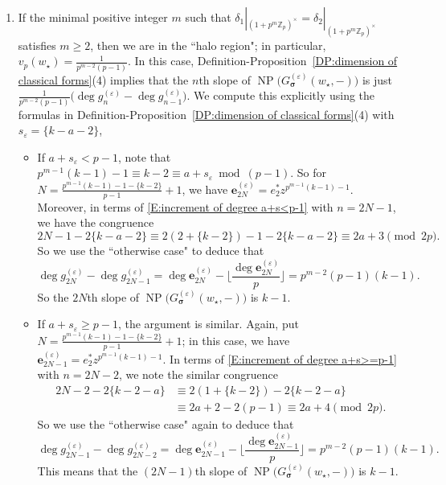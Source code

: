 \documentclass[12pt]{amsart}
\theoremstyle{definition}
\numberwithin{equation}{subsection}
\def\ZZ{\mathbb{Z}}
\def\bfe{\mathbf{e}}
\DeclareMathOperator{\NP}{NP}
\newcommand{\bbsigma}{\boldsymbol{\sigma}}
\begin{document}
\begin{enumerate}
\item[(2bii)] If the minimal positive integer $m$ such that $\delta_1|_{(1+p^m\ZZ_p)^\times}= \delta_2|_{(1+p^m\ZZ_p)^\times}$ satisfies $m\geq 2$, then we are in the ``halo region"; in particular, $v_p(w_\star) = \frac{1}{p^{m-2}(p-1)}$.
In this case, Definition-Proposition~\ref{DP:dimension of classical forms}(4) implies that the $n$th slope of $\NP\big( G_{\bbsigma}^{(\varepsilon)}(w_\star, -)\big)$ is just $\frac{1}{p^{m-2}(p-1)} \big( \deg g_n^{(\varepsilon)} - \deg g_{n-1}^{(\varepsilon)}\big)$.
We compute this explicitly using the formulas in Definition-Proposition~\ref{DP:dimension of classical forms}(4) with $s_\varepsilon = \{k-a-2\}$,
\begin{itemize}
\item If $a+s_\varepsilon<p-1$, note that $p^{m-1}(k-1)-1\equiv k-2 \equiv a+s_\varepsilon \bmod(p-1)$. So for $N = \frac{p^{m-1}(k-1)-1-\{k-2\}}{p-1}+1$, we have $\bfe_{2N}^{(\varepsilon)} = e_2^*z^{p^{m-1}(k-1)-1}$. Moreover, in terms of \eqref{E:increment of degree a+s<p-1} with $n = 2N-1$, we have the congruence
$$
2N-1 - 2\{k-a-2\} \equiv 2(2+\{k-2\}) - 1 - 2\{k-a-2\} \equiv 2a+3 \pmod{2p}.
$$
So we use the ``otherwise case" to deduce that
$$
\deg g_{2N}^{(\varepsilon)} - \deg g_{2N-1}^{(\varepsilon)} = \deg \bfe_{2N}^{(\varepsilon)} - \Big\lfloor \frac{\deg \bfe_{2N}^{(\varepsilon)}}p\Big\rfloor = p^{m-2}(p-1)(k-1).
$$
So the $2N$th slope of $\NP\big(G_{\bbsigma}^{(\varepsilon)}(w_\star,-)\big)$ is $k-1$.
\item If $a+s_\varepsilon\geq p-1$, the argument is similar.  Again, put $N =\frac{p^{m-1}(k-1)-1-\{k-2\}}{p-1}+1$; in this case, we have $\bfe_{2N-1}^{(\varepsilon)} = e_2^*z^{p^{m-1}(k-1)-1}$. In terms of \eqref{E:increment of degree a+s>=p-1} with $n = 2N-2$, we note the similar congruence
\begin{align*}
2N-2 - 2\{k-2-a\} &\equiv 2(1+\{k-2\}) - 2\{k-2-a\}
\\
&\equiv 2a+2-2(p-1)\equiv 2a+4\pmod {2p}.
\end{align*}
So we use the ``otherwise case" again to deduce that
$$
\deg g_{2N-1}^{(\varepsilon)} - \deg g_{2N-2}^{(\varepsilon)} = \deg \bfe_{2N-1}^{(\varepsilon)} - \Big\lfloor \frac{\deg \bfe_{2N-1}^{(\varepsilon)}}p\Big\rfloor = p^{m-2}(p-1)(k-1).
$$
This means that the $(2N-1)$th slope of $\NP\big(G_{\bbsigma}^{(\varepsilon)}(w_\star,-)\big)$ is $k-1$.
\end{itemize}
\end{enumerate} 
\end{document}

